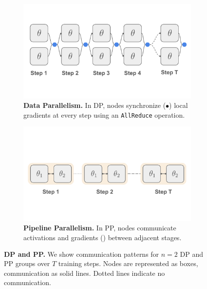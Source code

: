 \documentclass{article}
\newcommand{\orangebox}{\colorbox{oorange!50}{\hspace{0.3em}}}
\newcommand{\bluecircle}{\textcolor{bblue}{\LARGE$\bullet$}}
\begin{document}
\begin{figure}[ht]
    \centering
    \begin{subfigure}[b]{0.48\textwidth}
        \centering
        \vspace{0.5cm}
        \includegraphics[width=\textwidth]{figures/dp.pdf}
        \caption{\textbf{Data Parallelism.} In DP, nodes synchronize (\bluecircle) local gradients at every step using an \texttt{AllReduce}
        operation.}
        \label{fig:dp}
    \end{subfigure}
    \hfill
    \begin{subfigure}[b]{0.45\textwidth}
        \centering
        \vspace{0.5cm}
        \includegraphics[width=\textwidth]{figures/pp.pdf}
        \caption{\textbf{Pipeline Parallelism.} In PP, nodes communicate
        activations and gradients (\orangebox) between adjacent stages.}
        \label{fig:pp}
    \end{subfigure}
    \caption{\textbf{DP and PP.} We show communication patterns for $n=2$ DP and
    PP groups over $T$ training steps. Nodes are represented as boxes,
    communication as solid lines. Dotted lines indicate no communication.}
\end{figure}
\end{document}
